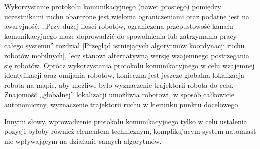 \begin{frame}
{Wykorzystanie protokołu komunikacyjnego (nawet prostego) pomiędzy uczestnikami ruchu obarczone jest wieloma ograniczeniami oraz podatne jest na awaryjność. ,,Przy dużej ilości robotów, ograniczona przepustowość kanału komunikacyjnego może doprowadzić do spowolnienia lub zatrzymania pracy całego systemu'' \cite{silver2005cooperative} rozdział \ref{Przegląd istniejących algorytmów koordynacji ruchu robotów mobilnych}, lecz stanowi alternatywną wersję wzajemnego postrzegania się robotów. Oprócz wykorzystania protokołu komunikacyjnego w celu wzajemnej identyfikacji oraz omijania robotów, konieczna jest jeszcze globalna lokalizacja robota na mapie, aby możliwe było wyznaczenie trajektorii robota do celu. Znajomość ,,globalnej'' lokalizacji umożliwia robotowi, w sposób całkowicie autonomiczny, wyznaczenie trajektorii ruchu w kierunku punktu docelowego. 

Innymi słowy, wprowadzenie protokołu komunikacyjnego tylko w celu ustalenia pozycji byłoby również elementem technicznym, komplikującym system natomiast nie wpływającym na działanie samych algorytmów.
}

\end{frame}
